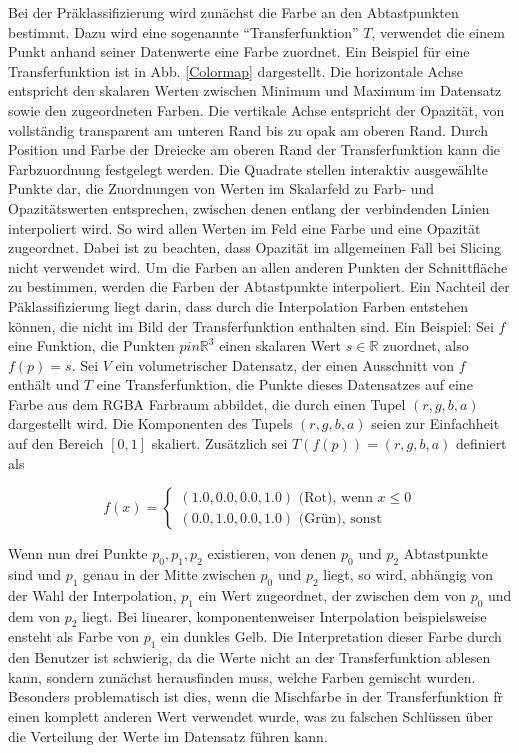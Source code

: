\documentclass[a4paper,fontsize=12pt,toc=bib,halfparskip]{scrartcl}
\begin{document}
Bei der Pr\"aklassifizierung wird zun\"achst die Farbe  an den Abtastpunkten bestimmt. Dazu wird eine sogenannte ``Transferfunktion'' $T$, verwendet die einem Punkt anhand seiner Datenwerte eine Farbe zuordnet. Ein Beispiel f\"ur eine Transferfunktion ist in Abb. \ref{Colormap} dargestellt. Die horizontale Achse entspricht den skalaren Werten zwischen Minimum und Maximum im Datensatz sowie den zugeordneten Farben. Die vertikale Achse entspricht der Opazit\"at, von vollst\"andig transparent am unteren Rand bis zu opak am oberen Rand. Durch Position und Farbe der Dreiecke am oberen Rand der Transferfunktion kann die Farbzuordnung festgelegt werden. Die Quadrate stellen interaktiv ausgew\"ahlte Punkte dar, die Zuordnungen von Werten im Skalarfeld zu Farb- und Opazit\"atswerten entsprechen, zwischen denen entlang der verbindenden Linien interpoliert wird. So wird allen Werten im Feld eine Farbe und eine Opazit\"at zugeordnet. Dabei ist zu beachten, dass Opazit\"at im allgemeinen Fall bei Slicing nicht verwendet wird. Um die Farben an allen anderen Punkten der Schnittfl\"ache zu bestimmen, werden die Farben der Abtastpunkte interpoliert. Ein Nachteil der P\"aklassifizierung liegt darin, dass durch die Interpolation Farben entstehen k\"onnen, die nicht im Bild der Transferfunktion enthalten sind. Ein Beispiel: Sei $f$ eine Funktion, die Punkten $p in \mathbb{R}^3$ einen skalaren Wert $s \in \mathbb{R}$ zuordnet, also $f(p) = s$. Sei $V$ ein volumetrischer Datensatz, der einen Ausschnitt von $f$ enth\"alt und $T$ eine Transferfunktion, die Punkte dieses Datensatzes auf eine Farbe aus dem RGBA Farbraum abbildet, die durch einen Tupel $(r,g,b,a)$ dargestellt wird. Die Komponenten des Tupels $(r,g,b,a)$ seien zur Einfachheit auf den Bereich $[0, 1]$ skaliert. Zus\"atzlich sei $T(f(p)) = (r,g,b,a)$ definiert als 

\begin{equation}
	f(x)= 
	\begin{cases}
		(1.0, 0.0, 0.0, 1.0)\text{ (Rot), wenn } x\leq 0\\
		(0.0, 1.0, 0.0, 1.0)\text{ (Gr\"un), sonst}
	\end{cases}
\end{equation}

Wenn nun drei Punkte $p_0, p_1, p_2$ existieren, von denen $p_0$ und $p_2$ Abtastpunkte sind und $p_1$ genau in der Mitte zwischen $p_0$ und $p_2$ liegt, so wird, abh\"angig von der Wahl der Interpolation, $p_1$ ein Wert zugeordnet, der zwischen dem von $p_0$ und dem von $p_2$ liegt. Bei linearer, komponentenweiser Interpolation beispielsweise ensteht als Farbe von $p_1$ ein dunkles Gelb. Die Interpretation dieser Farbe durch den Benutzer ist schwierig, da die Werte nicht an der Transferfunktion ablesen kann, sondern zun\"achst herausfinden muss, welche Farben gemischt wurden. Besonders problematisch ist dies, wenn die Mischfarbe in der Transferfunktion f\"r einen komplett anderen Wert verwendet wurde, was zu falschen Schl\"ussen \"uber die Verteilung der Werte im Datensatz f\"uhren kann.
\end{document}
